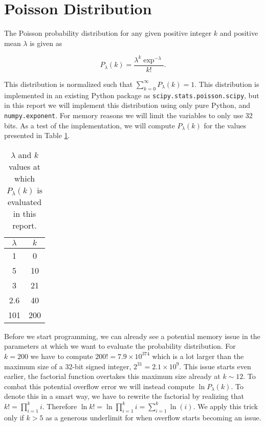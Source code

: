\section{Poisson Distribution}


The Poisson probability distribution for any given positive integer $k$ and positive mean $\lambda$ is given as

\begin{equation}
    P_{\lambda}(k) = \frac{\lambda^{k}\exp^{-\lambda}}{k!}.
\end{equation}

This distribution is normalized such that $\sum_{k=0}^{\infty} P_{\lambda}(k) = 1$. This distribution is implemented in an existing Python package as \texttt{scipy.stats.poisson.scipy}, but in this report we will implement this distribution using only pure Python, and \texttt{numpy.exponent}. For memory reasons we will limit the variables to only use 32 bits. As a test of the implementation, we will compute $P_{\lambda}(k)$ for the values presented in Table \ref{tab:poisson_vals}. 

\begin{table}[h]
    \centering
    \begin{tabular}{c|c}
    \hline
    $\lambda$ & $k$ \\
    \hline
        1 & 0 \\
        5 & 10 \\
        3 & 21 \\        
        2.6 & 40 \\
        101 & 200 \\
    \end{tabular}
    \caption{$\lambda$ and $k$ values at which $P_{\lambda}(k)$ is evaluated in this report.}
    \label{tab:poisson_vals}
\end{table}

Before we start programming, we can already see a potential memory issue in the parameters at which we want to evaluate the probability distribution. For $k = 200$ we have to compute $200! = 7.9 \times 10^{374}$ which is a lot larger than the maximum size of a 32-bit signed integer, $2^{31} = 2.1 \times 10^{9}$. This issue starts even earlier, the factorial function overtakes this maximum size already at $k \sim 12$. To combat this potential overflow error we will instead compute $\ln P_{\lambda}(k)$. To denote this in a smart way, we have to rewrite the factorial by realizing that $k! = \prod_{i=1}^k i$. Therefore $\ln k! = \ln \prod_{i=1}^k i = \sum_{i=1}^{k} \ln(i)$. We apply this trick only if $k > 5$ as a generous underlimit for when overflow starts becoming an issue.

